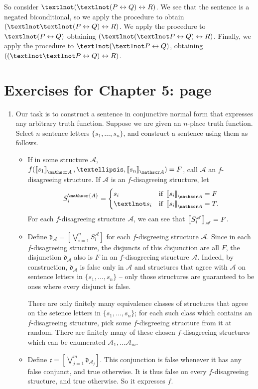 {\begin{enumerate}
So consider $¬(¬(P\bicond Q)\bicond R)$. We see that the sentence is a negated biconditional, so we apply the procedure to obtain $(¬¬(P \bicond Q) \bicond R)$. We apply the procedure to $¬(P\bicond Q)$ obtaining $(¬(¬P \bicond Q)\bicond R)$. Finally, we apply the procedure to $¬(¬P \bicond Q)$, obtaining $((¬¬P \bicond Q) \bicond R)$.



\end{enumerate}

\section*{Exercises for Chapter 5: page \pageref{ex5}} \label{ans5}

\begin{enumerate}
\item Our task is to construct a sentence in conjunctive normal form that expresses any arbitrary truth function. Suppose we are given an $n$-place truth function. Select $n$ sentence letters $\{s_{1},…,s_{n}\}$, and construct a sentence using them as follows. \begin{itemize}
	\item If in some structure $\mathscr{A}$, $f(\val{s_{1}}{A},…,\val{s_{n}}{A}) = F$, call $\mathscr{A}$ an $f$-disagreeing structure. If $\mathscr{A}$ is an $f$-disagreeing structure, let $$S^{\mathscr{A}}_{i} = \begin{cases}
		s_{i} &\text{if } \val{s_{i}}{A} = F\\	
		¬s_{i} &\text{if } \val{s_{i}}{A} = T.
	\end{cases}$$ For each $f$-disagreeing structure $\mathscr{A}$, we can see that $\left\llbracket S_{i}^{\mathscr{A}}\right\rrbracket_{\mathscr{A}} = F$.
	\item Define $\mathfrak{d}_{\mathscr{A}} = \left[\bigvee_{i=1}^{n}S^{\mathscr{A}}_{i}\right]$ for each $f$-disgreeing structure $\mathscr{A}$. Since in each $f$-disagreeing structure, the disjuncts of this disjunction are all $F$, the disjunction $\mathfrak{d}_{\mathscr{A}}$ also is $F$ in an $f$-disagreeing structure $\mathscr{A}$. Indeed, by construction, $\mathfrak{d}_{\mathscr{A}}$ is false only in $\mathscr{A}$ and structures that agree with $\mathscr{A}$ on sentence letters in $\{s_{1},…,s_{n}\}$ – only those structures are guaranteed to be ones where every disjunct is false. 

	There are only finitely many equivalence classes of structures that agree on the setence letters in $\{s_{1},…,s_{n}\}$; for each such class which contains an $f$-disagreeing structure,  pick some $f$-disgreeing structure from it at random. There are finitely many of these chosen $f$-disagreeing structures which can be enumerated $\mathscr{A}_{1},…\mathscr{A}_{m}$. 
	\item Define $\mathfrak{c} = \left[\bigvee_{j=1}^{m} \mathfrak{d}_{\mathscr{A}_{j}}\right]$. This conjunction is false whenever it has any false conjunct, and true otherwise. It is thus false on every $f$-disagreeing structure, and true otherwise. So it expresses $f$.


\end{itemize}
\end{enumerate}}
